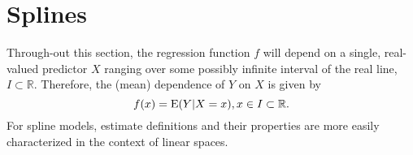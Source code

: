 \chapter{Splines}

Through-out this section, the regression function $f$ will depend on a
single, real-valued predictor $X$ ranging over some possibly infinite
interval of the real line, $I \subset \mathbb{R}$. Therefore, the
(mean) dependence of $Y$ on $X$ is given by
\begin{equation}
\label{fdef}
f(x) = \mbox{E}(Y|X=x), x \in I \subset \mathbb{R}.
\end{equation}
For spline models, estimate definitions and their properties 
are more easily characterized in the context of linear spaces. 






